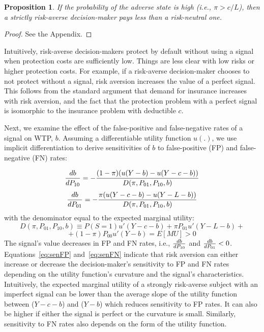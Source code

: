 \documentclass[12pt,a4paper]{article}
\newtheorem{theorem}{Proposition}
\begin{document}
\begin{theorem}
 If the probability of the adverse state is high (i.e., $\pi>c/L$), then a strictly risk-averse decision-maker pays less than a risk-neutral one.
\end{theorem} 
\begin{proof}
See the Appendix.
\end{proof}

Intuitively, risk-averse decision-makers protect by default without using a signal when protection costs are sufficiently low. Things are less clear with low risks or higher protection costs. For example, if a risk-averse decision-maker chooses to not protect without a signal, risk aversion increases the value of a perfect signal. This follows from the standard argument that demand for insurance increases with risk aversion, and the fact that the protection problem with a perfect signal is isomorphic to the insurance problem with deductible $c$. 

Next, we examine the effect of the false-positive and false-negative rates of a signal on WTP, $b$. Assuming a differentiable utility function $u(.)$, we use implicit differentiation to derive sensitivities of $b$ to false-positive (FP) and false-negative (FN) rates:

\begin{equation}
\label{eq:senFP}
	{db\over dP_{10}}=-{(1-\pi)(u(Y-b)-u(Y-c-b))\over D(\pi, P_{01}, P_{10}, b)}
\end{equation}
\begin{equation}
\label{eq:senFN}
	{db\over dP_{01}}=-{\pi(u(Y-c-b)-u(Y-L-b))\over D(\pi, P_{01}, P_{10}, b)}
\end{equation}
with the denominator equal to the expected marginal utility:
$$D(\pi, P_{01}, P_{10}, b)\equiv P(S=1)u'(Y-c-b)+\pi P_{01}u'(Y-L-b)+$$
$$+(1-\pi)P_{00}u'(Y-b)=E[MU]>0$$
The signal's value decreases in FP and FN rates, i.e., ${db\over dP_{10}}$ and ${db\over dP_{01}}<0$. 
Equations~\ref{eq:senFP} and~\ref{eq:senFN} indicate that risk aversion can either increase or decrease the decision-maker's sensitivity to FP and FN rates depending on the utility function's curvature and the signal's characteristics. Intuitively, the expected marginal utility of a strongly risk-averse subject with an imperfect signal can be lower than the average slope of the utility function between ($Y-c-b$) and ($Y-b$) which reduces sensitivity to FP rates. It can also be higher if either the signal is perfect or the curvature is small. Similarly, sensitivity to FN rates also depends on the form of the utility function.
\end{document}
